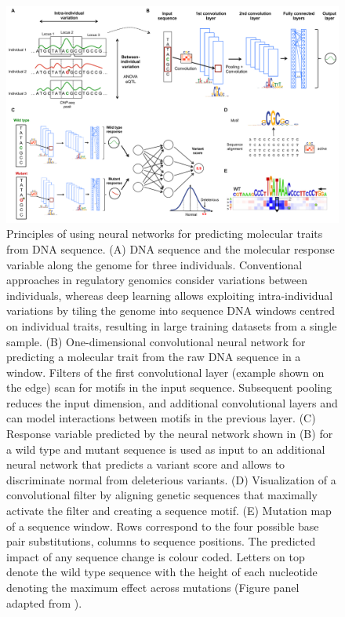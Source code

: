 \begin{figure}[htbp!]
\centering
\includegraphics[width=1.0\textwidth]{figure3}
\caption[Principles of using neural networks for predicting molecular traits from DNA sequence.]{Principles of using neural networks for predicting molecular traits from DNA sequence. (A) DNA sequence and the molecular response variable along the genome for three individuals. Conventional approaches in regulatory genomics consider variations between individuals, whereas deep learning allows exploiting intra-individual variations by tiling the genome into sequence DNA windows centred on individual traits, resulting in large training datasets from a single sample. (B) One-dimensional convolutional neural network for predicting a molecular trait from the raw DNA sequence in a window. Filters of the first convolutional layer (example shown on the edge) scan for motifs in the input sequence. Subsequent pooling reduces the input dimension, and additional convolutional layers and can model interactions between motifs in the previous layer. (C) Response variable predicted by the neural network shown in (B) for a wild type and mutant sequence is used as input to an additional neural network that predicts a variant score and allows to discriminate normal from deleterious variants. (D) Visualization of a convolutional filter by aligning genetic sequences that maximally activate the filter and creating a sequence motif. (E) Mutation map of a sequence window. Rows correspond to the four possible base pair substitutions, columns to sequence positions. The predicted impact of any sequence change is colour coded. Letters on top denote the wild type sequence with the height of each nucleotide denoting the maximum effect across mutations (Figure panel adapted from \citeauthor{alipanahi_predicting_2015}).}
\label{fig:figure3}
\end{figure}

